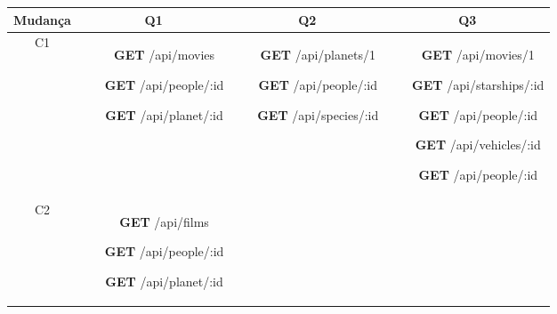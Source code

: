 \begin{table}[H]
  \centering
  \begin{tabular}{|c|c|c|c|}
    \hline
    Mudança & Q1 & Q2 & Q3 \\
    \hline
    C1 & \begin{minipage}[t]{0.3\textwidth}
      \begin{itemize}
        \item[\textbf{GET}] /api/movies
        \item[\textbf{GET}] /api/people/:id
        \item[\textbf{GET}] /api/planet/:id
      \end{itemize}
    \end{minipage} & \begin{minipage}[t]{0.3\textwidth}
      \begin{itemize}
        \item[\textbf{GET}] /api/planets/1
        \item[\textbf{GET}] /api/people/:id
        \item[\textbf{GET}] /api/species/:id
      \end{itemize}
    \end{minipage} & \begin{minipage}[t]{0.3\textwidth}
      \begin{itemize}
        \item[\textbf{GET}] /api/movies/1
        \item[\textbf{GET}] /api/starships/:id
        \item[\textbf{GET}] /api/people/:id
        \item[\textbf{GET}] /api/vehicles/:id
        \item[\textbf{GET}] /api/people/:id
      \end{itemize}
    \end{minipage} \\
    \hline
    C2 & \begin{minipage}[t]{0.3\textwidth}
      \begin{itemize}
        \item[\textbf{GET}] /api/films
        \item[\textbf{GET}] /api/people/:id
        \item[\textbf{GET}] /api/planet/:id
      \end{itemize}
    \end{minipage} & \begin{minipage}[t]{0.3\textwidth}
      \begin{itemize}

\end{itemize}
\end{minipage}
\end{tabular}
\end{table}
